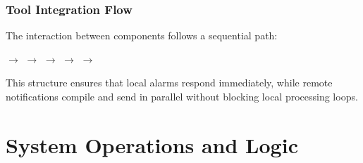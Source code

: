\documentclass[11pt,a4paper]{report}
\begin{document}
\subsection{Tool Integration Flow}
The interaction between components follows a sequential path:
\begin{center}
 $\rightarrow$  $\rightarrow$  $\rightarrow$  $\rightarrow$  $\rightarrow$ 
\end{center}
This structure ensures that local alarms respond immediately, while remote notifications compile and send in parallel without blocking local processing loops.
\chapter{System Operations and Logic}
\end{document}
